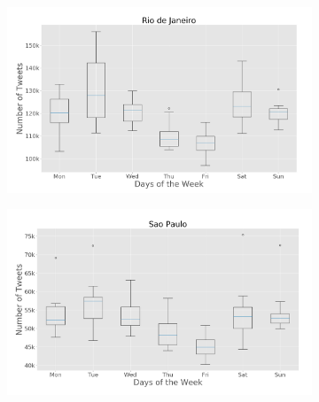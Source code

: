 \begin{figure}[h]
    \centering
    \begin{subfigure}[t]{0.45\textwidth}
        \centering
        \includegraphics[width=1\linewidth]{figures/rio_box_plt_day_of_week.png}
        \caption{}
        \label{fig:riodejaneiro_box_plot_day_of_week}
    \end{subfigure}%
    \quad
    \begin{subfigure}[t]{0.45\textwidth}
        \centering
        \includegraphics[width=1\linewidth]{figures/sp_box_plt_day_of_week.png}
        \caption{}
        \label{fig:saopaulo_box_plot_day_of_week}
    \end{subfigure}

    \medskip


\end{figure}
